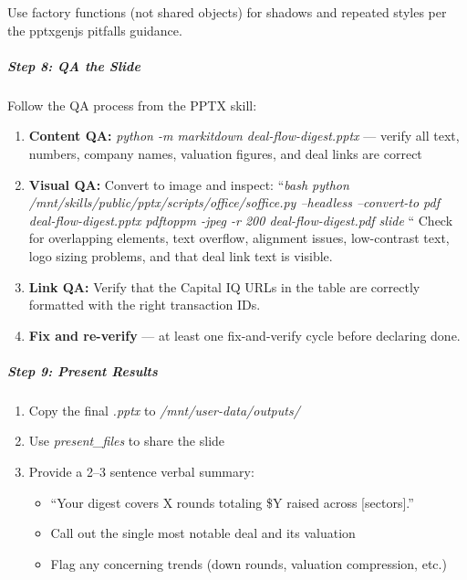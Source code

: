 \documentclass[11pt]{article}
\begin{document}
Use factory functions (not shared objects) for shadows and repeated styles per the pptxgenjs pitfalls guidance.


\subparagraph{Step 8: QA the Slide}\mbox{}\par

Follow the QA process from the PPTX skill:


\begin{enumerate}[leftmargin=*,itemsep=2pt,topsep=2pt]
\item {} \textbf{Content QA:} \emph{python -m markitdown deal-flow-digest.pptx} — verify all text, numbers, company names, valuation figures, and deal links are correct
\item {} \textbf{Visual QA:} Convert to image and inspect: ``\emph{bash python /mnt/skills/public/pptx/scripts/office/soffice.py --headless --convert-to pdf deal-flow-digest.pptx pdftoppm -jpeg -r 200 deal-flow-digest.pdf slide }`` Check for overlapping elements, text overflow, alignment issues, low-contrast text, logo sizing problems, and that deal link text is visible.
\item {} \textbf{Link QA:} Verify that the Capital IQ URLs in the table are correctly formatted with the right transaction IDs.
\item {} \textbf{Fix and re-verify} — at least one fix-and-verify cycle before declaring done.
\end{enumerate}

\subparagraph{Step 9: Present Results}\mbox{}\par

\begin{enumerate}[leftmargin=*,itemsep=2pt,topsep=2pt]
\item {} Copy the final \emph{.pptx} to \emph{/mnt/user-data/outputs/}
\item {} Use \emph{present\_\allowbreak{}files} to share the slide
\item {} Provide a 2–3 sentence verbal summary:
\begin{itemize}[leftmargin=*,itemsep=2pt,topsep=2pt]
\item {} ``Your digest covers X rounds totaling \$Y raised across [sectors].''
\item {} Call out the single most notable deal and its valuation
\item {} Flag any concerning trends (down rounds, valuation compression, etc.)
\end{itemize}
\end{enumerate}
\end{document}
